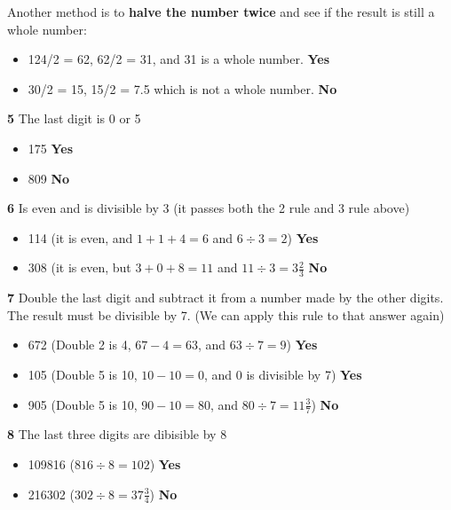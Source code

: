 Another method is to \textbf{halve the number twice} and see if the result is still a whole number:

\begin{itemize}
  \item 124/2 = 62, 62/2 = 31, and 31 is a whole number. \textbf{Yes}
  \item 30/2 = 15, 15/2 = 7.5 which is not a whole number. \textbf{No}
\end{itemize}

\vspace{10 mm}

\textbf{5} The last digit is 0 or 5

\begin{itemize}
  \item 175 \textbf{Yes}
  \item 809 \textbf{No}
\end{itemize}

\textbf{6} Is even and is divisible by 3 (it passes both the 2 rule and 3 rule above)

\begin{itemize}
  \item 114 (it is even, and $1+1+4=6$ and $6 \div 3 =2$) \textbf{Yes}
  \item 308 (it is even, but $3+0+8=11$ and $11 \div 3 = 3\frac{2}{3}$ \textbf{No}
\end{itemize}

\textbf{7} Double the last digit and subtract it from a number made by the other digits. The result must be divisible by 7. (We can apply this rule to that answer again)

\begin{itemize}
  \item 672 (Double 2 is 4, $67-4=63$, and $63 \div 7 = 9$) \textbf{Yes}
  \item 105 (Double 5 is 10, $10-10=0$, and 0 is divisible by 7) \textbf{Yes}
  \item 905 (Double 5 is 10, $90-10=80$, and $80 \div 7 =11\frac{3}{7}$) \textbf{No}
\end{itemize}

\vspace{7 mm}

\textbf{8} The last three digits are dibisible by 8

\begin{itemize}
  \item 109816 ($816 \div 8=102$) \textbf{Yes}
  \item 216302 ($302\div 8=37\frac{3}{4}$) \textbf{No}
\end{itemize}

